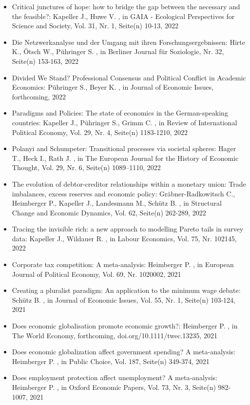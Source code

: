 \begin{itemize}
\item Critical junctures of hope: how to bridge the gap between the necessary and the feasible?: Kapeller J., Huwe V. , in GAIA - Ecological Perspectives for Science and Society, Vol. 31, Nr. 1, Seite(n) 10-13, 2022
\item Die Netzwerkanalyse und der Umgang mit ihren Forschungsergebnissen: Hirte K., Ötsch W., Pühringer S. , in Berliner Journal für Soziologie, Nr. 32, Seite(n) 153-163, 2022
\item Divided We Stand? Professional Consensus and Political Conflict in Academic Economics: Pühringer S., Beyer K. , in Journal of Economic Issues, forthcoming, 2022
\item Paradigms and Policies: The state of economics in the German-speaking countries: Kapeller J., Pühringer S., Grimm C. , in Review of International Political Economy, Vol. 29, Nr. 4, Seite(n) 1183-1210, 2022
\item Polanyi and Schumpeter: Transitional processes via societal spheres: Hager T., Heck I., Rath J. , in The European Journal for the History of Economic Thought, Vol. 29, Nr. 6, Seite(n) 1089–1110, 2022
\item The evolution of debtor-creditor relationships within a monetary union: Trade imbalances, excess reserves and economic policy: Gräbner-Radkowitsch C., Heimberger P., Kapeller J., Landesmann M., Schütz B. , in Structural Change and Economic Dynamics, Vol. 62, Seite(n) 262-289, 2022
\item Tracing the invisible rich: a new approach to modelling Pareto tails in survey data: Kapeller J., Wildauer R. , in Labour Economics, Vol. 75, Nr. 102145, 2022
\item Corporate tax competition: A meta-analysis: Heimberger P. , in European Journal of Political Economy, Vol. 69, Nr. 1020002, 2021
\item Creating a pluralist paradigm: An application to the minimum wage debate: Schütz B. , in Journal of Economic Issues, Vol. 55, Nr. 1, Seite(n) 103-124, 2021
\item Does economic globalisation promote economic growth?: Heimberger P. , in The World Economy, forthcoming, doi.org/10.1111/twec.13235, 2021
\item Does economic globalization affect government spending? A meta-analysis: Heimberger P. , in Public Choice, Vol. 187, Seite(n) 349-374, 2021
\item Does employment protection affect unemployment? A meta-analysis: Heimberger P. , in Oxford Economic Papers, Vol. 73, Nr. 3, Seite(n) 982-1007, 2021

\end{itemize}
